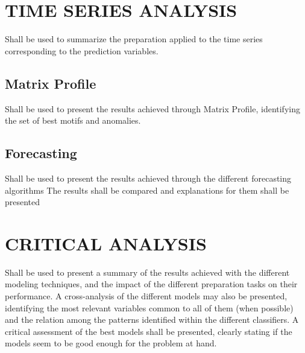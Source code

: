 \documentclass[11pt]{article}
\begin{document}

\section{TIME SERIES ANALYSIS}
\begin{tcolorbox} %
Shall be used to summarize the preparation applied to the time series corresponding to the prediction variables. 
\end{tcolorbox} %


\subsection*{Matrix Profile}
\begin{tcolorbox} %
Shall be used to present the results achieved through Matrix Profile, identifying the set of best motifs and anomalies.
\end{tcolorbox} %


\subsection*{Forecasting}
\begin{tcolorbox} %
Shall be used to present the results achieved through the different forecasting algorithms The results shall be compared and explanations for them shall be presented
\end{tcolorbox} %


\section{CRITICAL ANALYSIS}
\begin{tcolorbox} %
Shall be used to present a summary of the results achieved with the different modeling techniques, and the impact of the different preparation tasks on their performance. 
A cross-analysis of the different models may also be presented, identifying the most relevant variables common to all of them (when possible) and the relation among the patterns identified within the different classifiers.
A critical assessment of the best models shall be presented, clearly stating if the models seem to be good enough for the problem at hand. 
\end{tcolorbox} %
\end{document}
